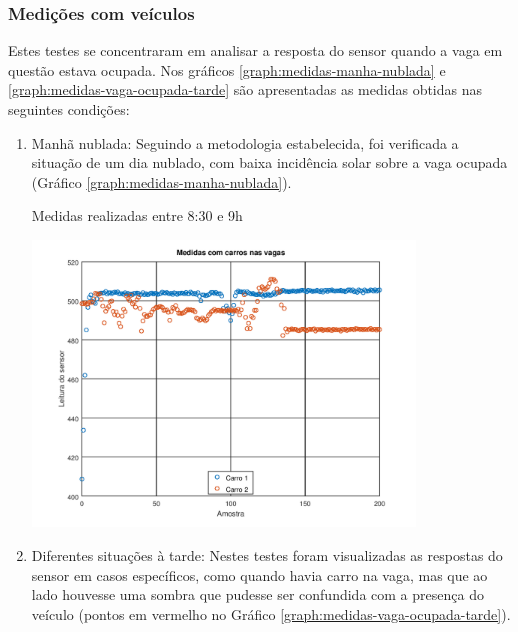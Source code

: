 \documentclass[oneside,openright,12pt]{ufsm_2015} %
\begin{document}
    \subsubsection{Medições com veículos}
    Estes testes se concentraram em analisar a resposta do sensor quando a vaga em questão estava ocupada. Nos gráficos \ref{graph:medidas-manha-nublada} e \ref{graph:medidas-vaga-ocupada-tarde} são apresentadas as medidas obtidas nas seguintes condições:
    \begin{enumerate}
        \item Manhã nublada: Seguindo a metodologia estabelecida, foi verificada a situação de um dia nublado, com baixa incidência solar sobre a vaga ocupada (Gráfico \ref{graph:medidas-manha-nublada}). 
        
        \begin{grafico}[H]
        
            \caption{\label{exepretex1}Medidas realizadas entre 8:30 e 9h}
    	    \centering
    	    \includegraphics[width=0.8\textwidth]{figuras/carros_manha_2.png}
    	    \vspace{\baselineskip} %
                \label{graph:medidas-manha-nublada}
        \end{grafico}
        
        \item Diferentes situações à tarde: Nestes testes foram visualizadas as respostas do sensor em casos específicos, como quando havia carro na vaga, mas que ao lado houvesse uma sombra que pudesse ser confundida com a presença do veículo (pontos em vermelho no Gráfico \ref{graph:medidas-vaga-ocupada-tarde}). 
        

\end{enumerate}
\end{document}
